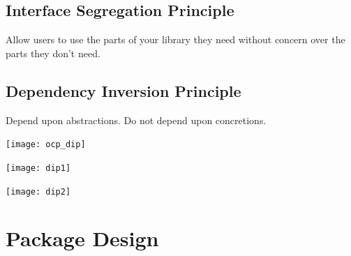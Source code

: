 \documentclass[xcolor=svgnames]{beamer}
\begin{document}

\subsection{Interface Segregation Principle}


\begin{frame}{\subsecname}
    Allow users to use the parts of your library they need without concern over
    the parts they don't need.
\end{frame}


\subsection{Dependency Inversion Principle}


\begin{frame}{\subsecname}
    Depend upon abstractions.  \pause Do not depend upon concretions.
\end{frame}


\begin{frame}{\subsecname}
    \centering
    \texttt{[image: ocp\_dip]}
\end{frame}


\begin{frame}{\subsecname}
    \centering
    \texttt{[image: dip1]}
\end{frame}


\begin{frame}{\subsecname}
    \centering
    \texttt{[image: dip2]}
\end{frame}


\section{Package Design}
\end{document}
